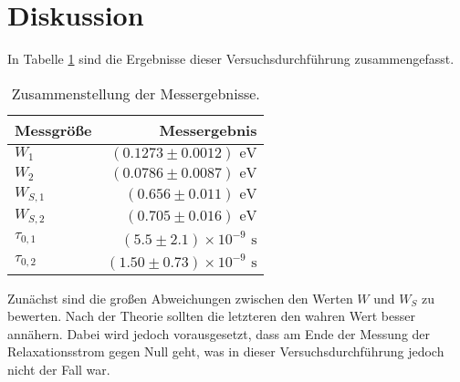 

\section{Diskussion}
In Tabelle \ref{tab:Diskussion} sind die Ergebnisse dieser Versuchsdurchführung 
zusammengefasst.

\begin{table}[H]
\centering
\begin{tabular}{lr}
\midrule \midrule
Messgröße & Messergebnis\\
\midrule

$W_1$ &$ (0.1273\pm 0.0012) \text{ eV}$ \\ 

$W_2 $& $(0.0786\pm 0.0087) \text{ eV}$ \\ 

$W_{S,1}$ &$ (0.656\pm 0.011) \text{ eV}$ \\ 

$W_{S,2}$ &$ (0.705\pm 0.016) \text{ eV}$ \\ 
 
$\tau_{0,1}$ & $(5.5 \pm 2.1) \times 10^{-9}\text{ s}$ \\ 

$\tau_{0,2} $& $(1.50 \pm 0.73) \times 10^{-9}\text{ s} $\\ 
\midrule \midrule
\end{tabular}
\caption{Zusammenstellung der Messergebnisse.}
\label{tab:Diskussion}
\end{table}

Zunächst sind die großen Abweichungen zwischen den Werten $W$ und $W_S$ zu bewerten. 
Nach der Theorie sollten die letzteren den wahren Wert besser annähern. Dabei 
wird jedoch vorausgesetzt, dass am Ende der Messung der Relaxationsstrom gegen Null 
geht, was in dieser Versuchsdurchführung jedoch nicht der Fall war. 